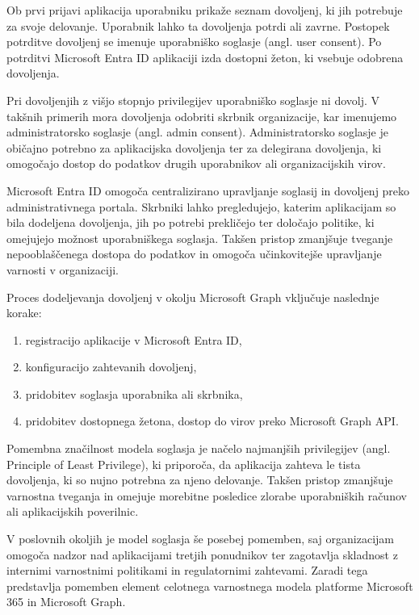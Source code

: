 \documentclass[a4paper, 12pt]{book}
\begin{document}
Ob prvi prijavi aplikacija uporabniku prikaže seznam dovoljenj, ki jih potrebuje za svoje delovanje. Uporabnik lahko ta dovoljenja potrdi ali zavrne. Postopek potrditve dovoljenj se imenuje uporabniško soglasje (angl. user consent). Po potrditvi Microsoft Entra ID aplikaciji izda dostopni žeton, ki vsebuje odobrena dovoljenja.

Pri dovoljenjih z višjo stopnjo privilegijev uporabniško soglasje ni dovolj. V takšnih primerih mora dovoljenja odobriti skrbnik organizacije, kar imenujemo administratorsko soglasje (angl. admin consent). Administratorsko soglasje je običajno potrebno za aplikacijska dovoljenja ter za delegirana dovoljenja, ki omogočajo dostop do podatkov drugih uporabnikov ali organizacijskih virov.

Microsoft Entra ID omogoča centralizirano upravljanje soglasij in dovoljenj preko administrativnega portala. Skrbniki lahko pregledujejo, katerim aplikacijam so bila dodeljena dovoljenja, jih po potrebi prekličejo ter določajo politike, ki omejujejo možnost uporabniškega soglasja. Takšen pristop zmanjšuje tveganje nepooblaščenega dostopa do podatkov in omogoča učinkovitejše upravljanje varnosti v organizaciji.

Proces dodeljevanja dovoljenj v okolju Microsoft Graph vključuje naslednje korake:

\begin{enumerate}
\item registracijo aplikacije v Microsoft Entra ID,
\item konfiguracijo zahtevanih dovoljenj,
\item pridobitev soglasja uporabnika ali skrbnika,
\item pridobitev dostopnega žetona,
dostop do virov preko Microsoft Graph API.
\end{enumerate}

Pomembna značilnost modela soglasja je načelo najmanjših privilegijev (angl. Principle of Least Privilege), ki priporoča, da aplikacija zahteva le tista dovoljenja, ki so nujno potrebna za njeno delovanje.
Takšen pristop zmanjšuje varnostna tveganja in omejuje morebitne posledice zlorabe uporabniških računov ali aplikacijskih poverilnic.

V poslovnih okoljih je model soglasja še posebej pomemben, saj organizacijam omogoča nadzor nad aplikacijami tretjih ponudnikov ter zagotavlja skladnost z internimi varnostnimi politikami in regulatornimi zahtevami.
Zaradi tega predstavlja pomemben element celotnega varnostnega modela platforme Microsoft 365 in Microsoft Graph.
\end{document}

